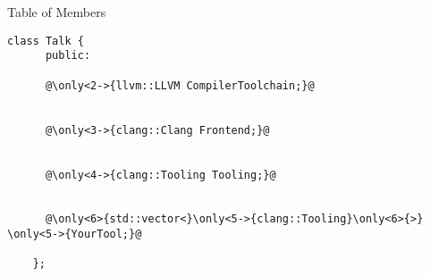 

\begin{frame}[fragile]{Table of Members}
  \begin{lstlisting}[basicstyle=\ttfamily\small]
    class Talk {
      public:

      @\only<2->{llvm::LLVM CompilerToolchain;}@


      @\only<3->{clang::Clang Frontend;}@


      @\only<4->{clang::Tooling Tooling;}@


      @\only<6>{std::vector<}\only<5->{clang::Tooling}\only<6>{>} \only<5->{YourTool;}@

    };
  \end{lstlisting}
\end{frame}
